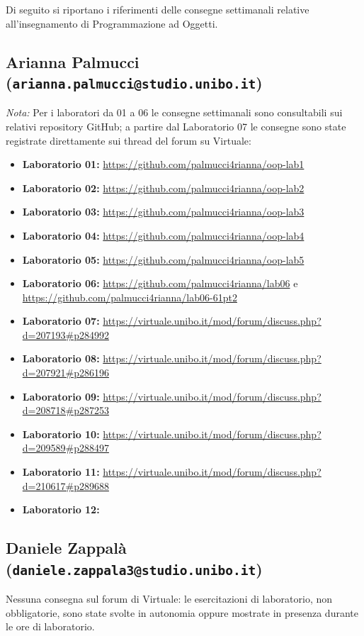 \documentclass[11pt,a4paper,openright]{report}
\begin{document}
Di seguito si riportano i riferimenti delle consegne settimanali relative all'insegnamento di Programmazione ad Oggetti.

\subsection*{Arianna Palmucci (\texttt{arianna.palmucci@studio.unibo.it})}

\noindent
\emph{Nota:} Per i laboratori da 01 a 06 le consegne settimanali sono consultabili sui relativi repository GitHub; a partire dal Laboratorio 07 le consegne sono state registrate direttamente sui thread del forum su Virtuale:

\begin{itemize}
  \item \textbf{Laboratorio 01:} \url{https://github.com/palmucci4rianna/oop-lab1}
  \item \textbf{Laboratorio 02:} \url{https://github.com/palmucci4rianna/oop-lab2}
  \item \textbf{Laboratorio 03:} \url{https://github.com/palmucci4rianna/oop-lab3}
  \item \textbf{Laboratorio 04:} \url{https://github.com/palmucci4rianna/oop-lab4}
  \item \textbf{Laboratorio 05:} \url{https://github.com/palmucci4rianna/oop-lab5}
  \item \textbf{Laboratorio 06:} \url{https://github.com/palmucci4rianna/lab06} \quad e \quad \url{https://github.com/palmucci4rianna/lab06-61pt2}
  \item \textbf{Laboratorio 07:} \url{https://virtuale.unibo.it/mod/forum/discuss.php?d=207193#p284992}
  \item \textbf{Laboratorio 08:} \url{https://virtuale.unibo.it/mod/forum/discuss.php?d=207921#p286196}
  \item \textbf{Laboratorio 09:} \url{https://virtuale.unibo.it/mod/forum/discuss.php?d=208718#p287253}
  \item \textbf{Laboratorio 10:} \url{https://virtuale.unibo.it/mod/forum/discuss.php?d=209589#p288497}
  \item \textbf{Laboratorio 11:} \url{https://virtuale.unibo.it/mod/forum/discuss.php?d=210617#p289688}
  \item \textbf{Laboratorio 12:}
\end{itemize}

\subsection*{Daniele Zappalà (\texttt{daniele.zappala3@studio.unibo.it})}
\noindent
Nessuna consegna sul forum di Virtuale: le esercitazioni di laboratorio, non obbligatorie, sono state svolte in autonomia oppure mostrate in presenza durante le ore di laboratorio.
\end{document}
